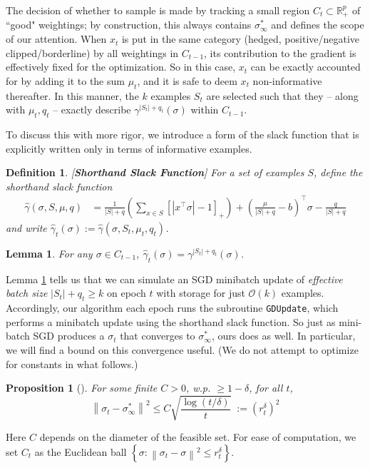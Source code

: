 \documentclass{colt2015} %
\newtheorem{lem}[thm]{Lemma}
\newtheorem{prop}[thm]{Proposition}
\newtheorem{defn}[thm]{Definition}
\newcommand{\RR}{\mathbb{R}}      %
\newcommand{\vnorm}[1]{\left\lVert#1\right\rVert} %
\newcommand{\abs}[1]{\left| #1 \right|}
\newcommand{\gamhat}{\hat{\gamma}}
\newcommand{\cO}{\mathcal{O}}
\newcommand{\lrp}[1]{\left(#1\right)}
\newcommand{\lrsetb}[1]{\left\{#1\right\}}
\renewcommand{\comment}[3]{\marginpar{\textcolor{#2}{#1: #3}}}
\newcommand{\akshay}[1]{\comment{Akshay}{orange}{#1}}
\begin{document}
The decision of whether to sample is made by tracking  
a small region $C_t \subset \RR_+^p$ of ``good" weightings; 
by construction, this always contains $\sigma_{\infty}^*$ and defines the scope of our attention. 
When $x_t$ is put in the same category (hedged, positive/negative clipped/borderline) 
by all weightings in $C_{t-1}$, 
its contribution to the gradient is effectively fixed for the optimization. 
So in this case, $x_t$ can be exactly accounted for by adding it to the sum $\mu_t$, 
and it is safe to deem $x_t$ non-informative thereafter. 
In this manner, the $k$ examples $S_t$ are selected 
such that they -- along with $\mu_t, q_t$ -- 
exactly describe $\gamma^{\abs{S_t} + q_t} (\sigma)$ within $C_{t-1}$.


To discuss this with more rigor, 
we introduce a form of the slack function that is explicitly written only in terms of informative examples. 
\begin{defn}
\label{def:approxslack}[\textbf{Shorthand Slack Function}]
For a set of examples $S$, define the \emph{shorthand slack function}
\begin{align*}
\gamhat (\sigma, S, \mu, q) 
&= \frac{1}{|S| + q} 
\lrp{ \sum_{x \in S} \left[ \abs{x^\top \sigma} - 1 \right]_{+} } 
+ \lrp{\frac{\mu}{|S| + q} - b}^\top \sigma - \frac{q}{|S| + q} 
\end{align*}
and write $\gamhat_t (\sigma) := \gamhat (\sigma, S_t, \mu_t, q_t)$.
\end{defn}
\begin{lem}
\label{lem:compressslack}
For any $\sigma \in C_{t-1}$, $\gamhat_t (\sigma) = \gamma^{|S_t| + q_t} (\sigma)$.
\end{lem}

Lemma \ref{lem:compressslack} tells us that we can simulate an SGD minibatch update 
of \emph{effective batch size} $|S_t| + q_t \geq k$ on epoch $t$ with storage for just $\cO(k)$ examples. 
Accordingly, our algorithm each epoch runs the subroutine \texttt{GDUpdate}, 
which performs a minibatch update using the shorthand slack function. 
So just as mini-batch SGD produces a $\sigma_t$ that converges to $\sigma_{\infty}^*$, 
ours does as well. 
In particular, we will find a bound on this convergence useful. 
(We do not attempt to optimize for constants in what follows.)
\begin{prop}[\cite{DGBSX12}]
\label{prop:sgdconvrate}
For some finite $C > 0$, w.p. $\geq 1-\delta$, for all $t$, 
$$ \vnorm{\sigma_t - \sigma_{\infty}^*}^2 \leq C \sqrt{\frac{\log (t/\delta)}{t}} \;:= (r_t^\delta)^2 $$ 
\end{prop}
\akshay{Find minibatch-size-dependent bound.}
Here $C$ depends on the diameter of the feasible set. 
For ease of computation, we set $C_t$ as the Euclidean ball $\lrsetb{ \sigma : \vnorm{\sigma_t - \sigma}^2 \leq r_t^\delta}$. 
\end{document}

